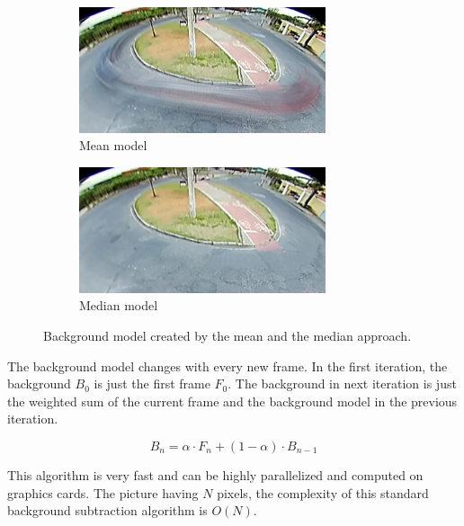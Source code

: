 \documentclass[a4paper,12pt,titlepage, twoside]{article}
\numberwithin{figure}{section}
\begin{document}
\begin{figure}
    \begin{subfigure}[Sample1]{0.5\linewidth}
        \includegraphics[height=37mm]{fig/background_mean_crop.png}
        \caption{Mean model}
        \label{fig:cut_mean}
    \end{subfigure}
    \qquad
    \begin{subfigure}[Sample1]{0.5\linewidth}    
        \includegraphics[height=37mm]{fig/background_med_crop.png}  
        \caption{Median model}
        \label{fig:cut_med}  
    \end{subfigure} 
    \caption{Background model created by the mean and the median approach.}
\end{figure}

The background model changes with every new frame. In the first iteration, the background $B_0$ is just the first frame $F_0$. The background in next iteration is just the weighted sum of the  current frame and the background model in the previous iteration.

\begin{equation}
B_n = \alpha \cdot F_n + (1 - \alpha) \cdot B_{n-1}
\end{equation}

This algorithm is very fast and can be highly parallelized and computed on graphics cards. The picture having $N$  pixels, the complexity of this standard background subtraction algorithm is  $O(N)$.
\end{document}
